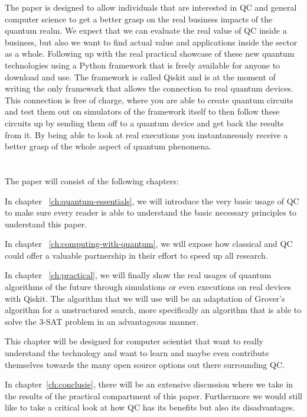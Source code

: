 The paper is designed to allow individuals that are interested in QC and general computer science  to get a better grasp on the real business impacts of the quantum realm. We expect that we can evaluate the real value of QC inside a business, but also we want to find actual value and applications inside the sector as a whole. Following up with the real practical showcase of these new quantum technologies using a Python framework that is freely available for anyone to download and use. The framework is called Qiskit and is at the moment of writing the only framework that allows the connection to real quantum devices. This connection is free of charge, where you are able to create quantum circuits and test them out on simulators of the framework  itself to then follow these circuits up by sending them off to a quantum device and get back the results from it. By being able to look at real executions you instantaneously receive a better grasp of the whole aspect of quantum phenomena.

\section{}
\label{sec:opzet-bachelorproef}

The paper will consist of the following chapters:

In chapter ~\ref{ch:quantum-essentials}, we will introduce the very basic usage of QC to make sure every reader is able to understand the basic necessary principles to understand this paper.

In chapter ~\ref{ch:computing-with-quantum}, we will expose how classical and QC could offer a valuable partnership in their effort to speed up all research. 

In chapter ~\ref{ch:practical}, we will finally show the real usages of quantum algorithms of the future through simulations or even executions on real devices with Qiskit. The algorithm that we will use will be an adaptation of Grover's algorithm for a unstructured search, more specifically an algorithm that is able to solve the 3-SAT problem in an advantageous manner.

This chapter will be designed for computer scientist that want to really understand the technology and want to learn and maybe even contribute themselves towards the many open source options out there surrounding QC.

In chapter~\ref{ch:conclusie}, there will be an extensive discussion where we take in the results of the practical compartment of this paper. Furthermore we would still like to take a critical look at how QC has its benefits but also its disadvantages. 